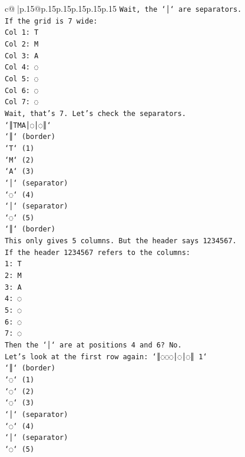 \documentclass{article}
\begin{document}
{\begin{supertabular}{c@{$\;$}|p{.15\linewidth}@{}p{.15\linewidth}p{.15\linewidth}p{.15\linewidth}p{.15\linewidth}p{.15\linewidth}}
{{{\texttt{Wait, the `│` are separators.} \\
\texttt{If the grid is 7 wide:} \\
\texttt{Col 1: T} \\
\texttt{Col 2: M} \\
\texttt{Col 3: A} \\
\texttt{Col 4: ◌} \\
\texttt{Col 5: ◌} \\
\texttt{Col 6: ◌} \\
\texttt{Col 7: ◌} \\
\texttt{Wait, that's 7. Let's check the separators.} \\
\texttt{`║TMA│◌│◌║`} \\
\texttt{`║` (border)} \\
\texttt{`T` (1)} \\
\texttt{`M` (2)} \\
\texttt{`A` (3)} \\
\texttt{`│` (separator)} \\
\texttt{`◌` (4)} \\
\texttt{`│` (separator)} \\
\texttt{`◌` (5)} \\
\texttt{`║` (border)} \\
\texttt{This only gives 5 columns. But the header says 1234567.} \\
\texttt{If the header 1234567 refers to the columns:} \\
\texttt{1: T} \\
\texttt{2: M} \\
\texttt{3: A} \\
\texttt{4: ◌} \\
\texttt{5: ◌} \\
\texttt{6: ◌} \\
\texttt{7: ◌} \\
\texttt{Then the `│` are at positions 4 and 6? No.} \\
\texttt{Let's look at the first row again: `║◌◌◌│◌│◌║ 1`} \\
\texttt{`║` (border)} \\
\texttt{`◌` (1)} \\
\texttt{`◌` (2)} \\
\texttt{`◌` (3)} \\
\texttt{`│` (separator)} \\
\texttt{`◌` (4)} \\
\texttt{`│` (separator)} \\
\texttt{`◌` (5)} \\
}}}
\end{supertabular}}
\end{document}
